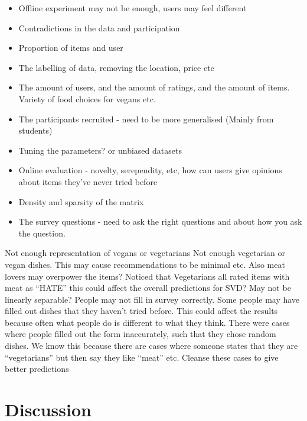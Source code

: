 \begin{itemize}
	\item{Offline experiment may not be enough, users may feel different}
	\item{Contradictions in the data and participation}
	\item{Proportion of items and user}
	\item{The labelling of data, removing the location, price etc}
	\item{The amount of users, and the amount of ratings, and the amount of items. Variety of food choices for vegans etc. }
	\item{The participants recruited - need to be more generalised (Mainly from students)}
	\item{Tuning the parameters? or unbiased datasets}
	\item{Online evaluation - novelty, serependity, etc, how can users give opinions about items they've never tried before}
	\item{Density and sparsity of the matrix}
	\item{The survey questions - need to ask the right questions and about how you ask the question.}
\end{itemize}
Not enough representation of vegans or vegetarians
Not enough vegetarian or vegan dishes. 
This may cause recommendations to be minimal etc.
Also meat lovers may overpower the items?
Noticed that Vegetarians all rated items with meat as “HATE” this could affect the overall predictions for SVD?
May not be linearly separable?
People may not fill in survey correctly.
Some people may have filled out dishes that they haven't tried before. This could affect the results because often what people do is different to what they think. 
There were cases where people filled out the form inaccurately, such that they chose random dishes. We know this because there are cases where someone states that they are “vegetarians” but then say they like “meat” etc.
Cleanse these cases to give better predictions

\section{Discussion}


